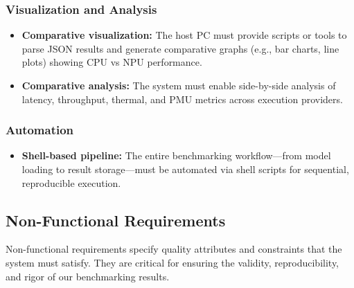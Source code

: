 \subsubsection*{Visualization and Analysis}
\begin{itemize}
    \item \textbf{Comparative visualization:} The host PC must provide scripts or tools to parse JSON results and generate comparative graphs (e.g., bar charts, line plots) showing CPU vs NPU performance.
    \item \textbf{Comparative analysis:} The system must enable side-by-side analysis of latency, throughput, thermal, and PMU metrics across execution providers.
\end{itemize}

\subsubsection*{Automation}
\begin{itemize}
    \item \textbf{Shell-based pipeline:} The entire benchmarking workflow—from model loading to result storage—must be automated via shell scripts for sequential, reproducible execution.
\end{itemize}

\subsection{Non-Functional Requirements}
Non-functional requirements specify quality attributes and constraints that the system must satisfy. They are critical for ensuring the validity, reproducibility, and rigor of our benchmarking results.

